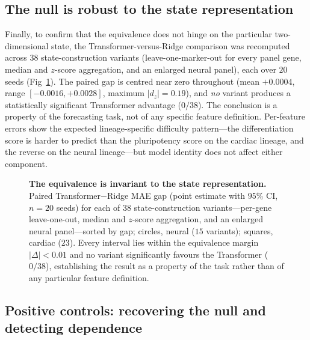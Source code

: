 \documentclass[10pt,letterpaper]{article}
\begin{document}
\subsection*{The null is robust to the state representation}
\label{subsec:res_sensitivity}

Finally, to confirm that the equivalence does not hinge on the particular two-dimensional state, the Transformer-versus-Ridge comparison was recomputed across $38$ state-construction variants (leave-one-marker-out for every panel gene, median and $z$-score aggregation, and an enlarged neural panel), each over $20$ seeds (Fig~\ref{fig:sensitivity}). The paired gap is centred near zero throughout (mean $+0.0004$, range $[-0.0016,+0.0028]$, maximum $|d_z|=0.19$), and \emph{no} variant produces a statistically significant Transformer advantage ($0/38$). The conclusion is a property of the forecasting task, not of any specific feature definition. Per-feature errors show the expected lineage-specific difficulty pattern---the differentiation score is harder to predict than the pluripotency score on the cardiac lineage, and the reverse on the neural lineage---but model identity does not affect either component.

\begin{figure}[!h]
\caption{\textbf{The equivalence is invariant to the state representation.} Paired Transformer$-$Ridge MAE gap (point estimate with $95\%$ CI, $n=20$ seeds) for each of $38$ state-construction variants---per-gene leave-one-out, median and $z$-score aggregation, and an enlarged neural panel---sorted by gap; circles, neural ($15$ variants); squares, cardiac ($23$). Every interval lies within the equivalence margin $|\Delta|<0.01$ and no variant significantly favours the Transformer ($0/38$), establishing the result as a property of the task rather than of any particular feature definition.}
\label{fig:sensitivity}
\end{figure}

\subsection*{Positive controls: recovering the null and detecting dependence}
\label{subsec:res_positive}
\end{document}
